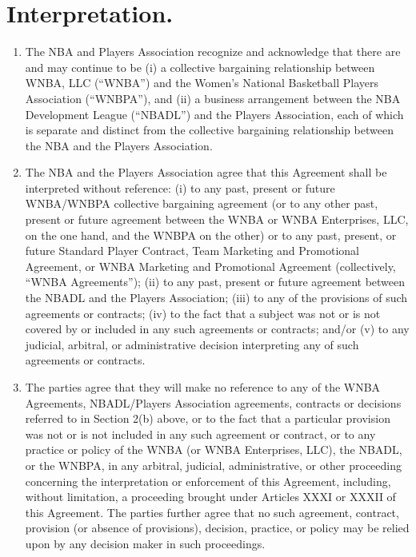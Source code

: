 \documentclass[
]{book}
\providecommand{\tightlist}{%
  \setlength{\itemsep}{0pt}\setlength{\parskip}{0pt}}
\begin{document}
\hypertarget{interpretation.}{%
\section{Interpretation.}\label{interpretation.}}

\begin{enumerate}
\def\labelenumi{(\alph{enumi})}
\tightlist
\item
  The NBA and Players Association recognize and acknowledge that there are and may continue to be (i) a collective bargaining relationship between WNBA, LLC (``WNBA'') and the Women's National Basketball Players Association (``WNBPA''), and (ii) a business arrangement between the NBA Development League (``NBADL'') and the Players Association, each of which is separate and distinct from the collective bargaining relationship between the NBA and the Players Association.
\item
  The NBA and the Players Association agree that this Agreement shall be interpreted without reference: (i) to any past, present or future WNBA/WNBPA collective bargaining agreement (or to any other past, present or future agreement between the WNBA or WNBA Enterprises, LLC, on the one hand, and the WNBPA on the other) or to any past, present, or future Standard Player Contract, Team Marketing and Promotional Agreement, or WNBA Marketing and Promotional Agreement (collectively, ``WNBA Agreements''); (ii) to any past, present or future agreement between the NBADL and the Players Association; (iii) to any of the provisions of such agreements or contracts; (iv) to the fact that a subject was not or is not covered by or included in any such agreements or contracts; and/or (v) to any judicial, arbitral, or administrative decision interpreting any of such agreements or contracts.
\item
  The parties agree that they will make no reference to any of the WNBA Agreements, NBADL/Players Association agreements, contracts or decisions referred to in Section 2(b) above, or to the fact that a particular provision was not or is not included in any such agreement or contract, or to any practice or policy of the WNBA (or WNBA Enterprises, LLC), the NBADL, or the WNBPA, in any arbitral, judicial, administrative, or other proceeding concerning the interpretation or enforcement of this Agreement, including, without limitation, a proceeding brought under Articles XXXI or XXXII of this Agreement. The parties further agree that no such agreement, contract, provision (or absence of provisions), decision, practice, or policy may be relied upon by any decision maker in such proceedings.
\end{enumerate}
\end{document}
